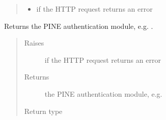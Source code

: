 \documentclass[letterpaper,10pt,english]{sphinxmanual}
\begin{document}
\begin{fulllineitems}
\begin{fulllineitems}
\begin{quote}
\begin{description}
\begin{itemize}
\item {} 
{\hyperref[\detokenize{autoapi/pine/client/exceptions/index:pine.client.exceptions.PineClientHttpException}]{}} \textendash{} if the HTTP request returns an error

\end{itemize}

\end{description}\end{quote}

\end{fulllineitems}


\begin{fulllineitems}
\label{\detokenize{autoapi/pine/client/index:pine.client.PineClient.get_auth_module}}
Returns the PINE authentication module, e.g. .
\begin{quote}\begin{description}
\item[{Raises}] \leavevmode
{\hyperref[\detokenize{autoapi/pine/client/exceptions/index:pine.client.exceptions.PineClientHttpException}]{}} \textendash{} if the HTTP request returns an error

\item[{Returns}] \leavevmode
the PINE authentication module, e.g. 

\item[{Return type}] \leavevmode
{}

\end{description}\end{quote}

\end{fulllineitems}



\end{fulllineitems}
\end{document}
